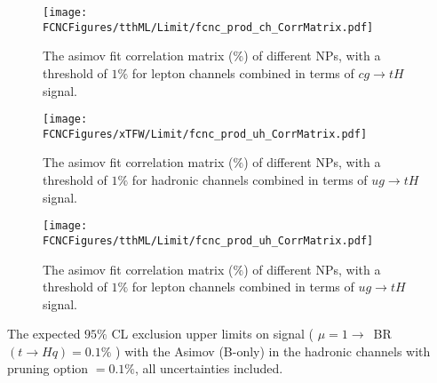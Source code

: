 \begin{figure}[H]
\centering
\texttt{[image: \\FCNCFigures/tthML/Limit/fcnc\_prod\_ch\_CorrMatrix.pdf]}
\caption{ The asimov fit correlation matrix ($\%$) of different NPs, with a threshold of $1\%$ for lepton channels combined in terms of $cg\to tH$ signal.}
\label{fig:fcnc_prod_ch_CorrMatrix_2}
\end{figure}





\begin{figure}[H]
\centering
\texttt{[image: \\FCNCFigures/xTFW/Limit/fcnc\_prod\_uh\_CorrMatrix.pdf]}
\caption{ The asimov fit correlation matrix ($\%$) of different NPs, with a threshold of $1\%$ for hadronic channels combined in terms of $ug\to tH$ signal.}
\label{fig:fcnc_prod_uh_CorrMatrix_1}
\end{figure}

\begin{figure}[H]
\centering
\texttt{[image: \\FCNCFigures/tthML/Limit/fcnc\_prod\_uh\_CorrMatrix.pdf]}
\caption{ The asimov fit correlation matrix ($\%$) of different NPs, with a threshold of $1\%$ for lepton channels combined in terms of $ug\to tH$ signal.}
\label{fig:fcnc_prod_uh_CorrMatrix_2}
\end{figure}




\begin{table}
\caption{The expected $95\%$ CL exclusion upper limits on signal ( $\mu=1\to$~BR$(t\to Hq)=0.1\%$ ) with the Asimov (B-only) in the hadronic channels with pruning option $=0.1\%$, all uncertainties included.}
\label{tab:limit_pruned}

\end{table}



\newpage